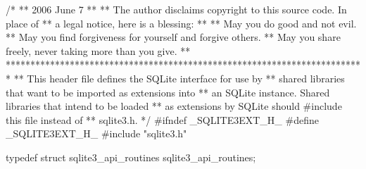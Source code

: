 \begin{Codex}[label=sqlite3ext.h,numbers=left]
/*
** 2006 June 7
**
** The author disclaims copyright to this source code.  In place of
** a legal notice, here is a blessing:
**
**    May you do good and not evil.
**    May you find forgiveness for yourself and forgive others.
**    May you share freely, never taking more than you give.
**
*************************************************************************
** This header file defines the SQLite interface for use by
** shared libraries that want to be imported as extensions into
** an SQLite instance.  Shared libraries that intend to be loaded
** as extensions by SQLite should #include this file instead of 
** sqlite3.h.
*/
#ifndef _SQLITE3EXT_H_
#define _SQLITE3EXT_H_
#include "sqlite3.h"

typedef struct sqlite3_api_routines sqlite3_api_routines;


\end{Codex}
